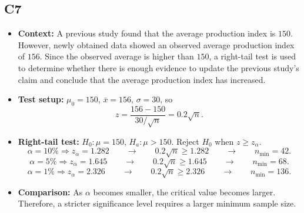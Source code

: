 \subsection*{C7}
\begin{itemize}
	\item \textbf{Context:} A previous study found that the average production index is \(150\). However, newly obtained data showed an observed average production index of \(156\). Since the observed average is higher than \(150\), a right-tail test is used to determine whether there is enough evidence to update the previous study's claim and conclude that the average production index has increased.
	\item \textbf{Test setup:} \(\mu_0=150\), \(\bar x=156\), \(\sigma=30\), so
	\[
	z=\frac{156-150}{30/\sqrt n}=0.2\sqrt n.
	\]
	\item \textbf{Right-tail test:} \(H_0:\mu=150\), \(H_a:\mu>150\). Reject \(H_0\) when \(z\ge z_{\alpha}\).
	\[
	\alpha=10\%\Rightarrow z_{\alpha}=1.282
	\qquad \longrightarrow \qquad
	0.2\sqrt n\ge1.282
	\qquad \longrightarrow \qquad
	n_{\min}=42.
	\]
	\[
	\alpha=5\%\Rightarrow z_{\alpha}=1.645
	\qquad \longrightarrow \qquad
	0.2\sqrt n\ge1.645
	\qquad \longrightarrow \qquad
	n_{\min}=68.
	\]
	\[
	\alpha=1\%\Rightarrow z_{\alpha}=2.326
	\qquad \longrightarrow \qquad
	0.2\sqrt n\ge2.326
	\qquad \longrightarrow \qquad
	n_{\min}=136.
	\]
	\item \textbf{Comparison:} As \(\alpha\) becomes smaller, the critical value becomes larger. Therefore, a stricter significance level requires a larger minimum sample size.
\end{itemize}



